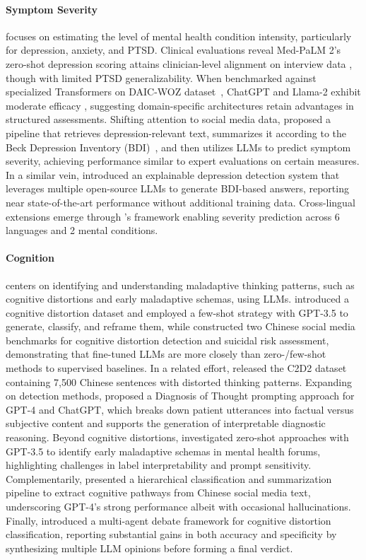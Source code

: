 \paragraph{Symptom Severity} focuses on estimating the level of mental health condition intensity, particularly for depression, anxiety, and PTSD. Clinical evaluations reveal Med-PaLM 2's zero-shot depression scoring attains clinician-level alignment on interview data \citep{11}, though with limited PTSD generalizability. When benchmarked against specialized Transformers on DAIC-WOZ dataset~\cite{gratch-etal-2014-distress}, ChatGPT and Llama-2 exhibit moderate efficacy \citep{23}, suggesting domain-specific architectures retain advantages in structured assessments. Shifting attention to social media data, \citet{58} proposed a pipeline that retrieves depression-relevant text, summarizes it according to the Beck Depression Inventory (BDI)~\cite{jackson2016beck}, and then utilizes LLMs to predict symptom severity, achieving performance similar to expert evaluations on certain measures. In a similar vein, \citet{59} introduced an explainable depression detection system that leverages multiple open-source LLMs to generate BDI-based answers, reporting near state-of-the-art performance without additional training data. Cross-lingual extensions emerge through \citet{100}'s framework enabling severity prediction across 6 languages and 2 mental conditions.

\paragraph{Cognition} centers on identifying and understanding maladaptive thinking patterns, such as cognitive distortions and early maladaptive schemas, using LLMs. \citet{5} introduced a cognitive distortion dataset and employed a few-shot strategy with GPT-3.5 to generate, classify, and reframe them, while \citet{10} constructed two Chinese social media benchmarks for cognitive distortion detection and suicidal risk assessment, demonstrating that fine-tuned LLMs are more closely than zero-/few-shot methods to supervised baselines. In a related effort, \citet{12} released the C2D2 dataset containing 7{,}500 Chinese sentences with distorted thinking patterns.
Expanding on detection methods, \citet{14} proposed a Diagnosis of Thought prompting approach for GPT-4 and ChatGPT, which breaks down patient utterances into factual versus subjective content and supports the generation of interpretable diagnostic reasoning. Beyond cognitive distortions, \citet{16} investigated zero-shot approaches with GPT-3.5 to identify early maladaptive schemas in mental health forums, highlighting challenges in label interpretability and prompt sensitivity. Complementarily, \citet{38} presented a hierarchical classification and summarization pipeline to extract cognitive pathways from Chinese social media text, underscoring GPT-4’s strong performance albeit with occasional hallucinations. Finally, \citet{45} introduced a multi-agent debate framework for cognitive distortion classification, reporting substantial gains in both accuracy and specificity by synthesizing multiple LLM opinions before forming a final verdict.

